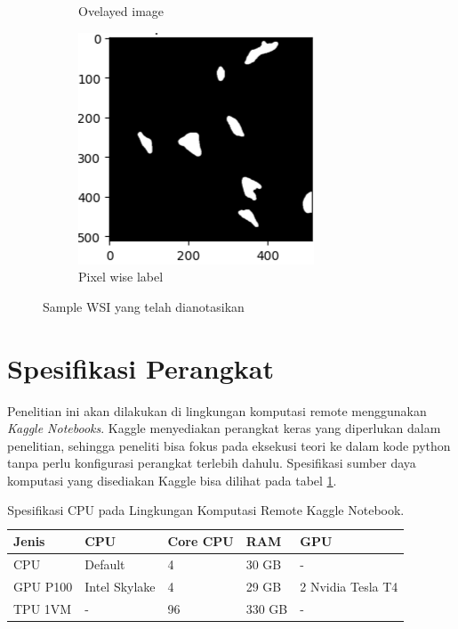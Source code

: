 \begin{figure}[H]
\begin{subfigure}[b]{0.3\textwidth}
		\caption{Ovelayed image}
		\label{fig:overlayed-image}
	\end{subfigure}
	\hfill
	\begin{subfigure}[b]{0.3\textwidth}
		\centering
		\includegraphics[width=\textwidth]{gambar/pixelwise_label.png}
		\caption{Pixel wise label}
		\label{fig:Pixel wise label}
	\end{subfigure}
	\caption{Sample WSI yang telah dianotasikan}
	\label{fig:sample_data}
\end{figure}

\section{Spesifikasi Perangkat}

\noindent Penelitian ini akan dilakukan di lingkungan komputasi remote menggunakan \textit{Kaggle Notebooks}. Kaggle menyediakan perangkat keras yang diperlukan dalam penelitian, sehingga peneliti bisa fokus pada eksekusi teori ke dalam kode python tanpa perlu konfigurasi perangkat terlebih dahulu. Spesifikasi sumber daya komputasi yang disediakan Kaggle bisa dilihat pada tabel \ref{tab:cpu_specs}.
\begin{table}[H]
	\centering
	\caption{Spesifikasi CPU pada Lingkungan Komputasi Remote Kaggle Notebook.}
	\label{tab:cpu_specs}
	\begin{tabular}{lllll}
		\hline
		\textbf{Jenis} & \textbf{CPU}  & \textbf{Core CPU} & \textbf{RAM} & \textbf{GPU}      \\ \hline
		CPU            & Default       & 4                 & 30 GB        & -                 \\
		GPU P100       & Intel Skylake & 4                 & 29 GB        & 2 Nvidia Tesla T4 \\
		TPU 1VM        & -             & 96                & 330 GB       & -                 \\ \hline
	\end{tabular}
\end{table}

